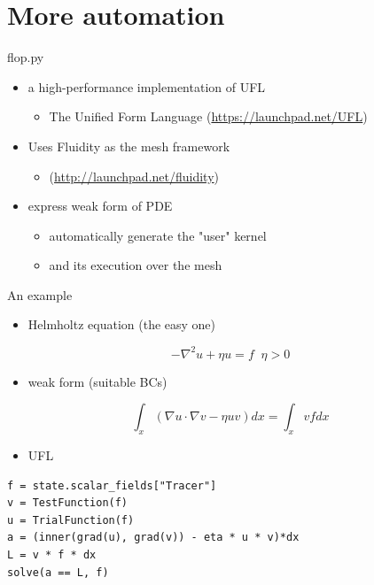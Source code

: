 \documentclass[bigger]{beamer}
\begin{document}
\section{More automation}
\label{sec:orgheadline14}
\begin{frame}[label={sec:orgheadline11}]{flop.py}
\begin{itemize}
\item a high-performance implementation of UFL
\begin{itemize}
\item The Unified Form Language (\url{https://launchpad.net/UFL})
\end{itemize}
\item Uses Fluidity as the mesh framework
\begin{itemize}
\item (\url{http://launchpad.net/fluidity})
\end{itemize}
\item express weak form of PDE
\begin{itemize}
\item automatically generate the "user" kernel
\item and its execution over the mesh
\end{itemize}
\end{itemize}
\end{frame}

\begin{frame}[fragile,label={sec:orgheadline12}]{An example}
 \begin{itemize}
\item Helmholtz equation (the easy one)
\end{itemize}
\begin{displaymath}
-\nabla^2 u + \eta u = f \;\; \eta > 0
\end{displaymath}
\begin{itemize}
\item weak form (suitable BCs)
\end{itemize}
\begin{displaymath}
\int_x (\nabla u \cdot \nabla v - \eta u v) dx = \int_x v f dx
\end{displaymath}
\begin{itemize}
\item UFL
\end{itemize}
\begin{verbatim}
f = state.scalar_fields["Tracer"]
v = TestFunction(f)
u = TrialFunction(f)
a = (inner(grad(u), grad(v)) - eta * u * v)*dx
L = v * f * dx
solve(a == L, f)
\end{verbatim}
\end{frame}
\end{document}
